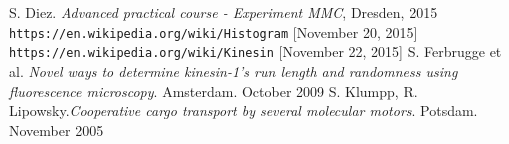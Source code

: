\begin{thebibliography}{99}
 S. Diez. \textit{Advanced practical course - Experiment MMC}, Dresden, 2015
 \texttt{https://en.wikipedia.org/wiki/Histogram} [November 20, 2015]
 \texttt{https://en.wikipedia.org/wiki/Kinesin} [November 22, 2015]
 S. Ferbrugge et al. \textit{Novel ways to determine kinesin-1's run length and randomness using fluorescence microscopy}. Amsterdam. October 2009
 S. Klumpp, R. Lipowsky.\textit{Cooperative cargo transport by several molecular motors}. Potsdam. November 2005
\end{thebibliography}